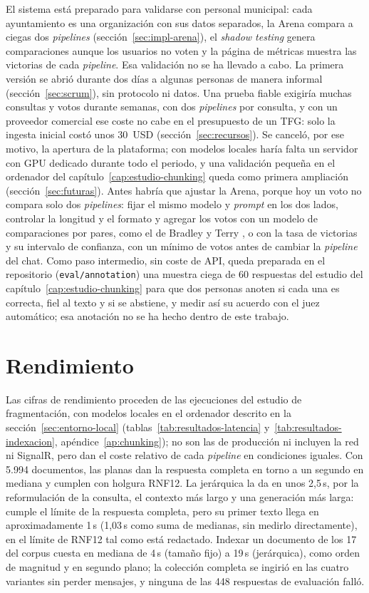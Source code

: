 El sistema está preparado para validarse con personal municipal: cada ayuntamiento es una organización con sus datos separados, la Arena compara a ciegas dos \emph{pipelines} (sección~\ref{sec:impl-arena}), el \emph{shadow testing} genera comparaciones aunque los usuarios no voten y la página de métricas muestra las victorias de cada \emph{pipeline}. Esa validación no se ha llevado a cabo. La primera versión se abrió durante dos días a algunas personas de manera informal (sección~\ref{sec:scrum}), sin protocolo ni datos. Una prueba fiable exigiría muchas consultas y votos durante semanas, con dos \emph{pipelines} por consulta, y con un proveedor comercial ese coste no cabe en el presupuesto de un TFG: solo la ingesta inicial costó unos 30~USD (sección~\ref{sec:recursos}). Se canceló, por ese motivo, la apertura de la plataforma; con modelos locales haría falta un servidor con GPU dedicado durante todo el periodo, y una validación pequeña en el ordenador del capítulo~\ref{cap:estudio-chunking} queda como primera ampliación (sección~\ref{sec:futuras}). Antes habría que ajustar la Arena, porque hoy un voto no compara solo dos \emph{pipelines}: fijar el mismo modelo y \emph{prompt} en los dos lados, controlar la longitud y el formato y agregar los votos con un modelo de comparaciones por pares, como el de Bradley y Terry \cite{bradley1952}, o con la tasa de victorias y su intervalo de confianza, con un mínimo de votos antes de cambiar la \emph{pipeline} del chat. Como paso intermedio, sin coste de API, queda preparada en el repositorio (\texttt{eval/annotation}) una muestra ciega de 60 respuestas del estudio del capítulo~\ref{cap:estudio-chunking} para que dos personas anoten si cada una es correcta, fiel al texto y si se abstiene, y medir así su acuerdo con el juez automático; esa anotación no se ha hecho dentro de este trabajo.

\section{Rendimiento}
\label{sec:rendimiento}

Las cifras de rendimiento proceden de las ejecuciones del estudio de fragmentación, con modelos locales en el ordenador descrito en la sección~\ref{sec:entorno-local} (tablas~\ref{tab:resultados-latencia} y~\ref{tab:resultados-indexacion}, apéndice~\ref{ap:chunking}); no son las de producción ni incluyen la red ni SignalR, pero dan el coste relativo de cada \emph{pipeline} en condiciones iguales. Con 5.994 documentos, las planas dan la respuesta completa en torno a un segundo en mediana y cumplen con holgura RNF12. La jerárquica la da en unos 2,5\,s, por la reformulación de la consulta, el contexto más largo y una generación más larga: cumple el límite de la respuesta completa, pero su primer texto llega en aproximadamente 1\,s (1,03\,s como suma de medianas, sin medirlo directamente), en el límite de RNF12 tal como está redactado. Indexar un documento de los 17 del corpus cuesta en mediana de 4\,s (tamaño fijo) a 19\,s (jerárquica), como orden de magnitud y en segundo plano; la colección completa se ingirió en las cuatro variantes sin perder mensajes, y ninguna de las 448 respuestas de evaluación falló.
